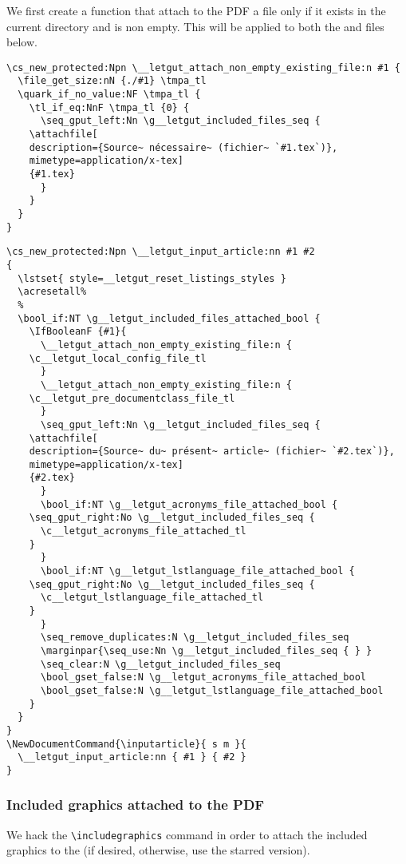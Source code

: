 \documentclass{letgut}
\begin{document}
We first create a function that attach to the PDF a file only if it exists in
the current directory and is non empty. This will be applied to both the
 and  files below.

\begin{lstlisting}
\cs_new_protected:Npn \__letgut_attach_non_empty_existing_file:n #1 {
  \file_get_size:nN {./#1} \tmpa_tl
  \quark_if_no_value:NF \tmpa_tl {
    \tl_if_eq:NnF \tmpa_tl {0} {
      \seq_gput_left:Nn \g__letgut_included_files_seq {
	\attachfile[
	description={Source~ nécessaire~ (fichier~ `#1.tex`)},
	mimetype=application/x-tex]
	{#1.tex}
      }
    }
  }
}
\end{lstlisting}

\begin{lstlisting}
\cs_new_protected:Npn \__letgut_input_article:nn #1 #2
{
  \lstset{ style=__letgut_reset_listings_styles }
  \acresetall%
  %
  \bool_if:NT \g__letgut_included_files_attached_bool {
    \IfBooleanF {#1}{
      \__letgut_attach_non_empty_existing_file:n {
	\c__letgut_local_config_file_tl
      }
      \__letgut_attach_non_empty_existing_file:n {
	\c__letgut_pre_documentclass_file_tl
      }
      \seq_gput_left:Nn \g__letgut_included_files_seq {
	\attachfile[
	description={Source~ du~ présent~ article~ (fichier~ `#2.tex`)},
	mimetype=application/x-tex]
	{#2.tex}
      }
      \bool_if:NT \g__letgut_acronyms_file_attached_bool {
	\seq_gput_right:No \g__letgut_included_files_seq {
	  \c__letgut_acronyms_file_attached_tl
	}
      }
      \bool_if:NT \g__letgut_lstlanguage_file_attached_bool {
	\seq_gput_right:No \g__letgut_included_files_seq {
	  \c__letgut_lstlanguage_file_attached_tl
	}
      }
      \seq_remove_duplicates:N \g__letgut_included_files_seq
      \marginpar{\seq_use:Nn \g__letgut_included_files_seq { } }
      \seq_clear:N \g__letgut_included_files_seq
      \bool_gset_false:N \g__letgut_acronyms_file_attached_bool
      \bool_gset_false:N \g__letgut_lstlanguage_file_attached_bool
    }
  }
}
\NewDocumentCommand{\inputarticle}{ s m }{
  \__letgut_input_article:nn { #1 } { #2 }
}
\end{lstlisting}

\subsubsection{Included graphics attached to the PDF}
\label{ImplementationMiscellanousIncludedgraphicsattachedtothePDF-xoc34ja00pj0}
We hack the \lstinline+\includegraphics+ command in order to attach the included graphics
to the \pdf{} (if desired, otherwise, use the starred version).
\end{document}

